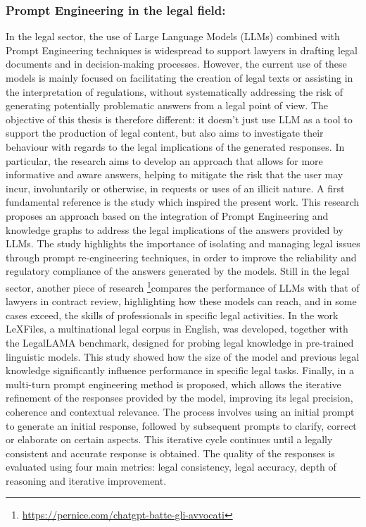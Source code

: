 \subsubsection{Prompt Engineering in the legal field:}
In the legal sector, the use of Large Language Models (LLMs) combined with Prompt Engineering techniques is widespread to support lawyers in drafting legal documents and in decision-making processes. However, the current use of these models is mainly focused on facilitating the creation of legal texts or assisting in the interpretation of regulations, without systematically addressing the risk of generating potentially problematic answers from a legal point of view.
The objective of this thesis is therefore different: it doesn't just use LLM as a tool to support the production of legal content, but also aims to investigate their behaviour with regards to the legal implications of the generated responses. In particular, the research aims to develop an approach that allows for more informative and aware answers, helping to mitigate the risk that the user may incur, involuntarily or otherwise, in requests or uses of an illicit nature.
A first fundamental reference is the study \cite{Damato}which inspired the present work. This research proposes an approach based on the integration of Prompt Engineering and knowledge graphs to address the legal implications of the answers provided by LLMs. The study highlights the importance of isolating and managing legal issues through prompt re-engineering techniques, in order to improve the reliability and regulatory compliance of the answers generated by the models.
Still in the legal sector, another piece of research \footnote{\url{https://pernice.com/chatgpt-batte-gli-avvocati}}compares the performance of LLMs with that of lawyers in contract review, highlighting how these models can reach, and in some cases exceed, the skills of professionals in specific legal activities.
In the work \cite{chalkidis2023lexfileslegallamafacilitatingenglish} LeXFiles, a multinational legal corpus in English, was developed, together with the LegalLAMA benchmark, designed for probing legal knowledge in pre-trained linguistic models. This study showed how the size of the model and previous legal knowledge significantly influence performance in specific legal tasks.
Finally, in \cite{cui2024chatlawmultiagentcollaborativelegal} a multi-turn prompt engineering method is proposed, which allows the iterative refinement of the responses provided by the model, improving its legal precision, coherence and contextual relevance. The process involves using an initial prompt to generate an initial response, followed by subsequent prompts to clarify, correct or elaborate on certain aspects. This iterative cycle continues until a legally consistent and accurate response is obtained. The quality of the responses is evaluated using four main metrics: legal consistency, legal accuracy, depth of reasoning and iterative improvement.
